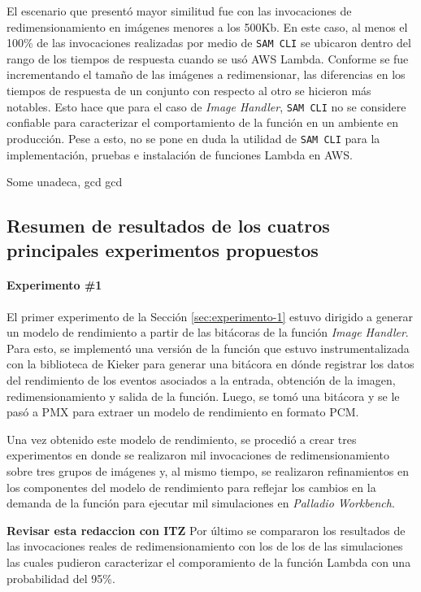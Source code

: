 El escenario que presentó mayor similitud fue con las invocaciones de redimensionamiento en imágenes menores a los 500Kb. En este caso, al menos el 100\% de las invocaciones realizadas por medio de \texttt{SAM CLI} se ubicaron dentro del rango de los tiempos de respuesta cuando se usó AWS Lambda. Conforme se fue incrementando el tamaño de las imágenes a redimensionar, las diferencias en los tiempos de respuesta de un conjunto con respecto al otro se hicieron más notables. Esto hace que para el caso de \emph{Image Handler}, \texttt{SAM CLI} no se considere confiable para caracterizar el comportamiento de la función en un ambiente en producción. Pese a esto, no se pone en duda la utilidad de \texttt{SAM CLI} para la implementación, pruebas e instalación de funciones Lambda en AWS.

Some \gls{unadeca}, \acrlong{gcd} \acrshort{gcd}


\subsection{Resumen de resultados de los cuatros principales experimentos propuestos}
\paragraph{Experimento \#1} El primer experimento de la Sección \ref{sec:experimento-1} estuvo dirigido a generar un modelo de rendimiento a partir de las bitácoras de la función \emph{Image Handler}. Para esto, se implementó una versión de la función que estuvo instrumentalizada con la biblioteca de Kieker para generar una bitácora en dónde registrar los datos del rendimiento de los eventos asociados a la entrada, obtención de la imagen, redimensionamiento y salida de la función. Luego, se tomó una bitácora y se le pasó a PMX para extraer un modelo de rendimiento en formato PCM. 

Una vez obtenido este modelo de rendimiento, se procedió a crear tres experimentos en donde se realizaron mil invocaciones de redimensionamiento sobre tres grupos de imágenes y, al mismo tiempo, se realizaron refinamientos en los componentes del modelo de rendimiento para reflejar los cambios en la demanda de la función para ejecutar mil simulaciones en \emph{Palladio Workbench}.

\textbf{Revisar esta redaccion con ITZ}
Por último se compararon los resultados de las invocaciones reales de redimensionamiento con los de los de las simulaciones las cuales pudieron caracterizar el comporamiento de la función Lambda con una probabilidad del 95\%. 

